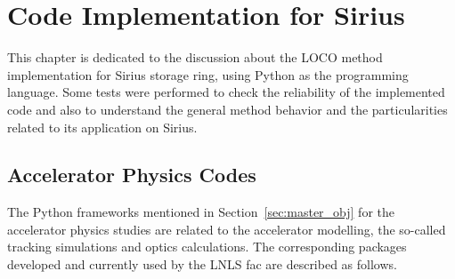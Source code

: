 \chapter{Code Implementation for Sirius}\label{chap:code_studies}
This chapter is dedicated to the discussion about the LOCO method implementation for Sirius storage ring, using Python as the programming language. Some tests were performed to check the reliability of the implemented code and also to understand the general method behavior and the particularities related to its application on Sirius.

\section{Accelerator Physics Codes}
The Python frameworks mentioned in Section~\ref{sec:master_obj} for the accelerator physics studies are related to the accelerator modelling, the so-called tracking simulations and optics calculations. The corresponding packages developed and currently used by the LNLS \gls{fac} are described as follows.

